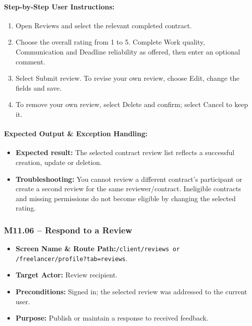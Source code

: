 \paragraph{Step-by-Step User Instructions:}
\begin{enumerate}[leftmargin=1.8em,itemsep=3pt]
  \item {} Open Reviews and select the relevant completed contract.
  \item {} Choose the overall rating from 1 to 5. Complete Work quality, Communication and Deadline reliability as offered, then enter an optional comment.
  \item {} Select Submit review. To revise your own review, choose Edit, change the fields and save.
  \item {} To remove your own review, select Delete and confirm; select Cancel to keep it.
\end{enumerate}
\paragraph{Expected Output \& Exception Handling:}
\begin{itemize}[leftmargin=1.5em,itemsep=2pt]
  \item \textbf{Expected result:} The selected contract review list reflects a successful creation, update or deletion.
  \item \textbf{Troubleshooting:} You cannot review a different contract's participant or create a second review for the same reviewer/contract. Ineligible contracts and missing permissions do not become eligible by changing the selected rating.
\end{itemize}

\newpage
\subsubsection{M11.06 -- Respond to a Review}
\begin{itemize}[leftmargin=1.5em,itemsep=2pt]
  \item \textbf{Screen Name \& Route Path:}\newline \texttt{/client/reviews or /freelancer/profile?tab=reviews}.
  \item \textbf{Target Actor:} Review recipient.
  \item \textbf{Preconditions:} Signed in; the selected review was addressed to the current user.
  \item \textbf{Purpose:} Publish or maintain a response to received feedback.
\end{itemize}
